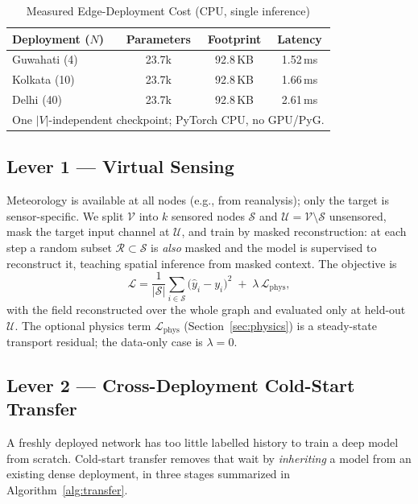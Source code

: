 \documentclass[journal]{IEEEtran}
\newcommand{\V}{\ensuremath{|V|}\xspace}
\begin{document}
\begin{table}[!t]
\caption{Measured Edge-Deployment Cost (CPU, single inference)}
\label{tab:edge}
\centering
\footnotesize
\begin{tabular}{lccc}
\toprule
Deployment ($N$) & Parameters & Footprint & Latency \\
\midrule
Guwahati (4)  & 23.7k & 92.8\,KB & 1.52\,ms \\
Kolkata (10)  & 23.7k & 92.8\,KB & 1.66\,ms \\
Delhi (40)    & 23.7k & 92.8\,KB & 2.61\,ms \\
\bottomrule
\multicolumn{4}{l}{\footnotesize One \V-independent checkpoint; PyTorch CPU, no GPU/PyG.}
\end{tabular}
\end{table}

\subsection{Lever 1 --- Virtual Sensing}\label{sec:vsense}
Meteorology is available at all nodes (e.g., from reanalysis); only the target is sensor-specific. We split $\mathcal{V}$ into $k$ sensored nodes $\mathcal{S}$ and $\mathcal{U}=\mathcal{V}\setminus\mathcal{S}$ unsensored, mask the target input channel at $\mathcal{U}$, and train by masked reconstruction: at each step a random subset $\mathcal{R}\subset\mathcal{S}$ is \emph{also} masked and the model is supervised to reconstruct it, teaching spatial inference from masked context. The objective is
\begin{equation}
\mathcal{L}=\frac{1}{|\mathcal{S}|}\sum_{i\in\mathcal{S}}\big(\hat{y}_i-y_i\big)^2 \;+\; \lambda\,\mathcal{L}_{\mathrm{phys}},
\label{eq:vsense}
\end{equation}
with the field reconstructed over the whole graph and evaluated only at held-out $\mathcal{U}$. The optional physics term $\mathcal{L}_{\mathrm{phys}}$ (Section~\ref{sec:physics}) is a steady-state transport residual; the data-only case is $\lambda{=}0$.

\subsection{Lever 2 --- Cross-Deployment Cold-Start Transfer}\label{sec:transfer}
A freshly deployed network has too little labelled history to train a deep model from scratch. Cold-start transfer removes that wait by \emph{inheriting} a model from an existing dense deployment, in three stages summarized in Algorithm~\ref{alg:transfer}.
\end{document}
